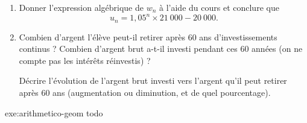 {\begin{enumerate}[resume]
		La suite $w$ est-elle arithmétique ? géométrique ? 
		Donner son terme initial et sa raison.
		\item 
		Donner l'expression algébrique de $w_n$ à l'aide du cours et conclure que
			\[ u_n = 1,05^n \times 21~000 - 20~000.\]
		\item
		Combien d'argent l'élève peut-il retirer après 60 ans d'investissements continus ?
		Combien d'argent brut a-t-il investi pendant ces 60 années (on ne compte pas les intérêts réinvestis) ?
		
		Décrire l'évolution de l'argent brut investi vers l'argent qu'il peut retirer après 60 ans (augmentation ou diminution, et de quel pourcentage).
	\end{enumerate}
}{exe:arithmetico-geom}{
	todo
}




\newpage
{}
\shipoutAnswer


